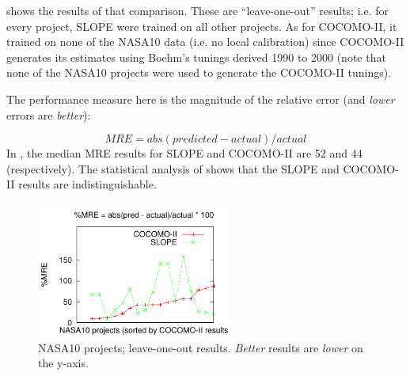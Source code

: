  shows the results of that comparison.
These are ``leave-one-out'' results; i.e. for every project, SLOPE 
were trained on all other projects.  
As for COCOMO-II, it trained on none of the NASA10 data
(i.e.   no
     local calibration) since COCOMO-II generates its estimates using
     Boehm's tunings derived 1990 to 2000 (note that none of the NASA10
projects were used to generate the COCOMO-II tunings).

The performance measure here is the magnitude
of the relative error (and {\em lower} errors are {\em better}):

{\small
\begin{equation}\label{eq:mre}
\mathit{MRE}= \mathit{abs(predicted - actual)/actual}
\end{equation}}
In , the median MRE results for SLOPE and COCOMO-II are 52 and 44 (respectively).
The statistical analysis of 
shows that the SLOPE and COCOMO-II results are indistinguishable. 
\begin{figure}
\includegraphics[width=2.5in]{mmre.pdf}
\caption{NASA10 projects; leave-one-out results.
{\em Better} results are {\em lower} on the y-axis.}\label{fig:mmre}
\end{figure}
